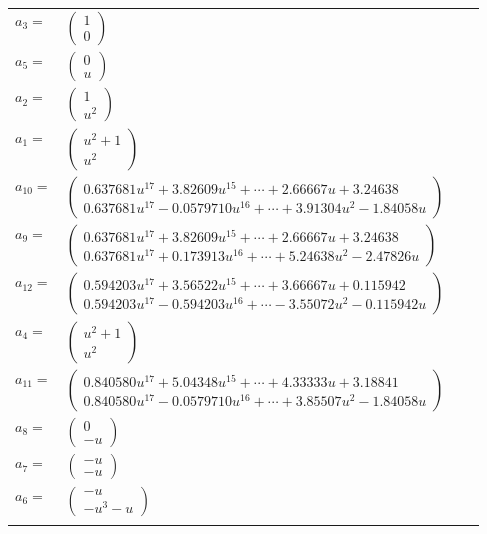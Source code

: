 \documentclass[1p]{elsarticle_modified}
\theoremstyle{definition}
\begin{document}
\begin{tabular}{m{7pt} m{180pt} m{7pt} m{180pt} }
\flushright $a_{3}=$&$\begin{pmatrix}1\\0\end{pmatrix}$ \\
\flushright $a_{5}=$&$\begin{pmatrix}0\\u\end{pmatrix}$ \\
\flushright $a_{2}=$&$\begin{pmatrix}1\\u^2\end{pmatrix}$ \\
\flushright $a_{1}=$&$\begin{pmatrix}u^2+1\\u^2\end{pmatrix}$ \\
\flushright $a_{10}=$&$\begin{pmatrix}0.637681 u^{17}+3.82609 u^{15}+\cdots+2.66667 u+3.24638\\0.637681 u^{17}-0.0579710 u^{16}+\cdots+3.91304 u^{2}-1.84058 u\end{pmatrix}$ \\
\flushright $a_{9}=$&$\begin{pmatrix}0.637681 u^{17}+3.82609 u^{15}+\cdots+2.66667 u+3.24638\\0.637681 u^{17}+0.173913 u^{16}+\cdots+5.24638 u^{2}-2.47826 u\end{pmatrix}$ \\
\flushright $a_{12}=$&$\begin{pmatrix}0.594203 u^{17}+3.56522 u^{15}+\cdots+3.66667 u+0.115942\\0.594203 u^{17}-0.594203 u^{16}+\cdots-3.55072 u^{2}-0.115942 u\end{pmatrix}$ \\
\flushright $a_{4}=$&$\begin{pmatrix}u^2+1\\u^2\end{pmatrix}$ \\
\flushright $a_{11}=$&$\begin{pmatrix}0.840580 u^{17}+5.04348 u^{15}+\cdots+4.33333 u+3.18841\\0.840580 u^{17}-0.0579710 u^{16}+\cdots+3.85507 u^{2}-1.84058 u\end{pmatrix}$ \\
\flushright $a_{8}=$&$\begin{pmatrix}0\\- u\end{pmatrix}$ \\
\flushright $a_{7}=$&$\begin{pmatrix}- u\\- u\end{pmatrix}$ \\
\flushright $a_{6}=$&$\begin{pmatrix}- u\\- u^3- u\end{pmatrix}$\\&\end{tabular}
\end{document}
